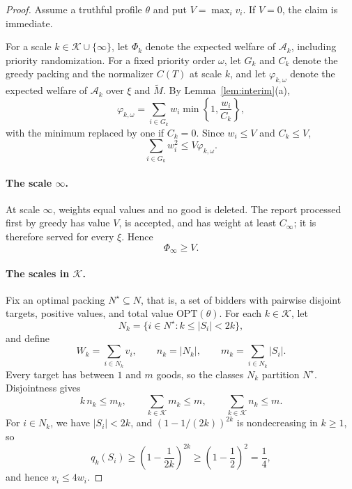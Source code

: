 \documentclass[format=acmsmall, review=false]{acmart}
\newcommand{\OPT}{\mathrm{OPT}}
\begin{document}
\begin{proof}
Assume a truthful profile \(\theta\) and put \(V=\max_i v_i\).
If \(V=0\), the claim is immediate.

For a scale \(k\in\mathcal K\cup\{\infty\}\), let \(\Phi_k\)
denote the expected welfare of \(\mathcal A_k\), including
priority randomization. For a fixed priority order \(\omega\),
let \(G_k\) and \(C_k\) denote the greedy packing and the
normalizer \(C(T)\) at scale \(k\), and let
\(\varphi_{k,\omega}\) denote the expected welfare of
\(\mathcal A_k\) over \(\xi\) and \(\widetilde M\). By
Lemma~\ref{lem:interim}(a),
\[
\varphi_{k,\omega}
=
\sum_{i\in G_k}
w_i\min\left\{1,\frac{w_i}{C_k}\right\},
\]
with the minimum replaced by one if \(C_k=0\).
Since \(w_i\le V\) and \(C_k\le V\),
\begin{equation}\label{eq:squares}
\sum_{i\in G_k}w_i^2\le V\varphi_{k,\omega}.
\end{equation}

\paragraph{The scale \(\infty\).}
At scale \(\infty\), weights equal values and no good is
deleted. The report processed first by greedy has value \(V\),
is accepted, and has weight at least \(C_\infty\); it is
therefore served for every \(\xi\). Hence
\begin{equation}\label{eq:top}
\Phi_\infty\ge V.
\end{equation}

\paragraph{The scales in \(\mathcal K\).}
Fix an optimal packing \(N^\star\subseteq N\), that is, a set of
bidders with pairwise disjoint targets, positive values, and
total value \(\OPT(\theta)\). For each \(k\in\mathcal K\), let
\[
N_k=\{i\in N^\star:k\le |S_i|<2k\},
\]
and define
\[
W_k=\sum_{i\in N_k}v_i,\qquad
n_k=|N_k|,\qquad
m_k=\sum_{i\in N_k}|S_i|.
\]
Every target has between \(1\) and \(m\) goods, so the classes
\(N_k\) partition \(N^\star\). Disjointness gives
\begin{equation}\label{eq:mass}
k\,n_k\le m_k,\qquad
\sum_{k\in\mathcal K}m_k\le m,\qquad
\sum_{k\in\mathcal K}n_k\le m.
\end{equation}
For \(i\in N_k\), we have \(|S_i|<2k\), and
\((1-1/(2k))^{2k}\) is nondecreasing in \(k\ge1\), so
\[
q_k(S_i)
\ge
\left(1-\frac{1}{2k}\right)^{2k}
\ge\left(1-\frac12\right)^{2}
=\frac14,
\]
and hence \(v_i\le4w_i\).


\end{proof}
\end{document}
